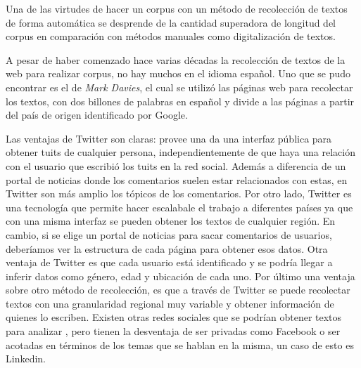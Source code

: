 Una de las virtudes de hacer un corpus con un método de recolección de textos de forma automática se desprende de la cantidad superadora de longitud del corpus en comparación con métodos manuales como digitalización de textos.

A pesar de haber comenzado hace varias décadas la recolección de textos de la web para realizar corpus, no hay muchos en el idioma español.
Uno que se pudo encontrar es el de \textit{Mark Davies}, el cual se utilizó las páginas web para recolectar los textos, con dos billones de palabras en español y divide a las páginas a partir del país de origen identificado por Google.

Las ventajas de Twitter son claras: provee una da una interfaz pública para obtener tuits de cualquier persona, independientemente de que haya una relación con el usuario que escribió los tuits en la red social. Además a diferencia de un portal de noticias donde los comentarios suelen estar relacionados con estas, en Twitter son más amplio los tópicos de los comentarios.
Por otro lado, Twitter es una tecnología que permite hacer escalabale el trabajo a diferentes países ya que con una misma interfaz se pueden obtener los textos de cualquier región. En cambio, si se elige un portal de noticias para sacar comentarios de usuarios, deberíamos ver la estructura de cada página para obtener esos datos.
Otra ventaja de Twitter es que cada usuario está identificado y se podría llegar a inferir datos como género, edad y ubicación de cada uno.
Por último una ventaja sobre otro método de recolección, es que a través de Twitter se puede recolectar textos con una granularidad regional muy variable y obtener información de quienes lo escriben.
Existen otras redes sociales que se podrían obtener textos para analizar , pero tienen la desventaja de ser privadas como Facebook o ser acotadas en términos de los temas que se hablan en la misma, un caso de esto es Linkedin. 



